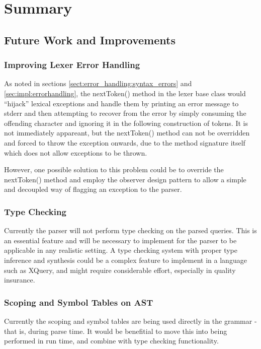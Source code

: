 \chapter{Summary}

\section{Future Work and Improvements}
\subsection{Improving Lexer Error Handling}
As noted in sections \ref{sect:error_handling:syntax_errors} and
\ref{sec:impl:errorhandling}, the nextToken() method in the lexer base class
would ``hijack'' lexical exceptions and handle them by printing an error message
to stderr and then attempting to recover from the error by simply consuming the
offending character and ignoring it in the following construction of tokens. It is 
not immediately appareant, but the nextToken() method can not be overridden and
forced to throw the exception onwards, due to the method signature itself which
does not allow exceptions to be thrown. 

However, one possible solution to this problem could be to override the
nextToken() method and employ the observer design
pattern to allow a
simple and decoupled way of flagging an exception to the parser.

\subsection{Type Checking}
Currently the parser will not perform type checking on the parsed queries. This
is an essential feature and will be necessary to implement for the parser to be
applicable in any realistic setting. A type checking system with proper type
inference and synthesis could be a complex feature to implement in a language
such as XQuery, and might require considerable effort, especially in quality
insurance. 

\subsection{Scoping and Symbol Tables on AST}
Currently the scoping and symbol tables are being used directly in the grammar -
that is, during parse time. It would be benefitial to move this into being
performed in run time, and combine with type checking functionality.

